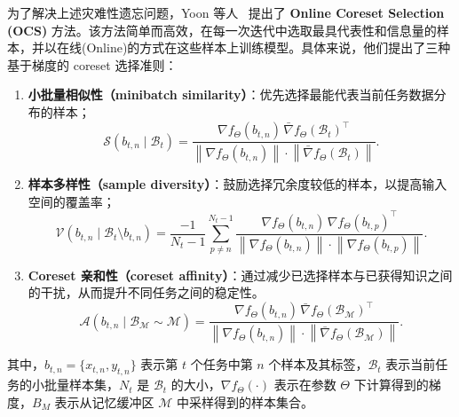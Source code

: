 \documentclass[lang=cn,newtx,10pt,scheme=chinese,chinesefont=nofont,citestyle=gb7714-2015, bibstyle=gb7714-2015]{elegantbook}
\begin{document}
\begin{refsection}
\begin{example}
    为了解决上述灾难性遗忘问题，Yoon 等人~\cite{yoononline} 提出了 \textbf{Online Coreset Selection (OCS)} 方法。该方法简单而高效，在每一次迭代中选取最具代表性和信息量的样本，并以在线(Online)的方式在这些样本上训练模型。具体来说，他们提出了三种基于梯度的 coreset 选择准则：
\begin{enumerate}
    \item \textbf{小批量相似性（minibatch similarity）}：优先选择最能代表当前任务数据分布的样本；
    \begin{equation*}
        \mathcal{S}(b_{t,n} \mid \mathcal{B}_t) = 
\frac{ \nabla f_\Theta(b_{t,n}) \, \bar{\nabla} f_\Theta(\mathcal{B}_t)^\top }
{ \left\| \nabla f_\Theta(b_{t,n}) \right\| \cdot \left\| \bar{\nabla} f_\Theta(\mathcal{B}_t) \right\| }.
    \end{equation*}
    \item \textbf{样本多样性（sample diversity）}：鼓励选择冗余度较低的样本，以提高输入空间的覆盖率；
    \begin{equation*}
        \mathcal{V}(b_{t,n} \mid \mathcal{B}_t \setminus b_{t,n}) = 
\frac{-1}{N_t - 1} \sum_{p \ne n}^{N_t - 1} 
\frac{ \nabla f_\Theta(b_{t,n}) \, \nabla f_\Theta(b_{t,p})^\top }
{ \left\| \nabla f_\Theta(b_{t,n}) \right\| \cdot \left\| \nabla f_\Theta(b_{t,p}) \right\| }.
    \end{equation*}
    \item \textbf{Coreset 亲和性（coreset affinity）}：通过减少已选择样本与已获得知识之间的干扰，从而提升不同任务之间的稳定性。
    \begin{equation*}
        \mathcal{A}(b_{t,n} \mid \mathcal{B}_\mathcal{M} \sim \mathcal{M}) = 
\frac{ \nabla f_\Theta(b_{t,n}) \, \bar{\nabla} f_\Theta(\mathcal{B}_\mathcal{M})^\top }
{ \left\| \nabla f_\Theta(b_{t,n}) \right\| \cdot \left\| \bar{\nabla} f_\Theta(\mathcal{B}_\mathcal{M}) \right\| }.
    \end{equation*}
\end{enumerate}
其中，$b_{t,n} = \{x_{t,n}, y_{t,n}\}$ 表示第 $t$ 个任务中第 $n$ 个样本及其标签，$\mathcal{B}_t$ 表示当前任务的小批量样本集，$N_t$ 是 $\mathcal{B}_t$ 的大小，$\nabla f_\Theta(\cdot)$ 表示在参数 $\Theta$ 下计算得到的梯度，$B_M$ 表示从记忆缓冲区 $\mathcal{M}$ 中采样得到的样本集合。
\end{example}


\end{refsection}
\end{document}
